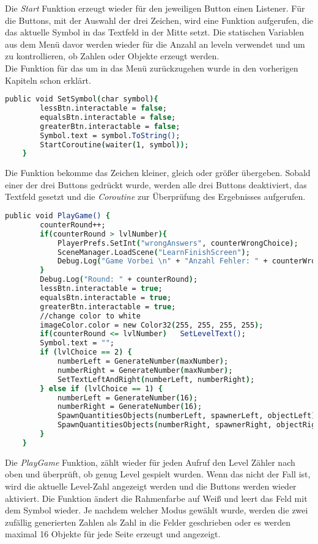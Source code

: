 Die \textit{Start} Funktion erzeugt wieder für den jeweiligen Button einen Listener. Für die Buttons, mit der Auswahl der drei Zeichen, wird eine Funktion aufgerufen, die das aktuelle Symbol in das Textfeld in der Mitte setzt. Die statischen Variablen aus dem Menü davor werden wieder für die Anzahl an leveln verwendet und um zu kontrollieren, ob Zahlen oder Objekte erzeugt werden.\\

Die Funktion für das um in das Menü zurückzugehen wurde in den vorherigen Kapiteln schon erklärt.\\

\begin{lstlisting}[language=csh, caption={GameQuantities.cs SetSymbol Funktion}]
	public void SetSymbol(char symbol){
		lessBtn.interactable = false;
		equalsBtn.interactable = false;
		greaterBtn.interactable = false;
		Symbol.text = symbol.ToString();
		StartCoroutine(waiter(1, symbol));
	}
\end{lstlisting}
Die Funktion bekomme das Zeichen kleiner, gleich oder größer übergeben. Sobald einer der drei Buttons gedrückt wurde, werden alle drei Buttons deaktiviert, das Textfeld gesetzt und die \textit{Coroutine} zur Überprüfung des Ergebnisses aufgerufen.\\
\begin{lstlisting}[language=csh, caption={GameQuantities.cs PlayGame Funktion}]
	public void PlayGame() {
		counterRound++;
		if(counterRound > lvlNumber){
			PlayerPrefs.SetInt("wrongAnswers", counterWrongChoice);
			SceneManager.LoadScene("LearnFinishScreen");
			Debug.Log("Game Vorbei \n" + "Anzahl Fehler: " + counterWrongChoice);
		}
		Debug.Log("Round: " + counterRound);
		lessBtn.interactable = true;
		equalsBtn.interactable = true;
		greaterBtn.interactable = true;
		//change color to white
		imageColor.color = new Color32(255, 255, 255, 255);
		if(counterRound <= lvlNumber)	SetLevelText();
		Symbol.text = "";
		if (lvlChoice == 2) {
			numberLeft = GenerateNumber(maxNumber);
			numberRight = GenerateNumber(maxNumber);
			SetTextLeftAndRight(numberLeft, numberRight);
		} else if (lvlChoice == 1) {
			numberLeft = GenerateNumber(16);
			numberRight = GenerateNumber(16);
			SpawnQuantitiesObjects(numberLeft, spawnerLeft, objectLeft);
			SpawnQuantitiesObjects(numberRight, spawnerRight, objectRight);
		}
	}
\end{lstlisting}
Die \textit{PlayGame} Funktion, zählt wieder für jeden Aufruf den Level Zähler nach oben und überprüft, ob genug Level gespielt wurden. Wenn das nicht der Fall ist, wird die aktuelle Level-Zahl angezeigt werden und die Buttons werden wieder aktiviert. Die Funktion ändert die Rahmenfarbe auf Weiß und leert das Feld mit dem Symbol wieder. Je nachdem welcher Modus gewählt wurde, werden die zwei zufällig generierten Zahlen als Zahl in die Felder geschrieben oder es werden maximal 16 Objekte für jede Seite erzeugt und angezeigt.\\
